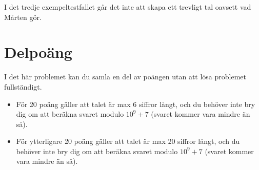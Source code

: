 I det tredje exempeltestfallet går det inte att skapa ett trevligt tal oavsett
vad Mårten gör.

\section*{Delpoäng}
I det här problemet kan du samla en del av poängen utan att lösa problemet
fullständigt.

\begin{itemize}
    \item För 20 poäng gäller att talet är max 6 siffror långt, och du behöver
        inte bry dig om att beräkna svaret modulo $10^9 + 7$ (svaret kommer
        vara mindre än så).
    \item För ytterligare 20 poäng gäller att talet är max 20 siffror långt,
        och du behöver inte bry dig om att beräkna svaret modulo $10^9 + 7$
        (svaret kommer vara mindre än så).
\end{itemize}
